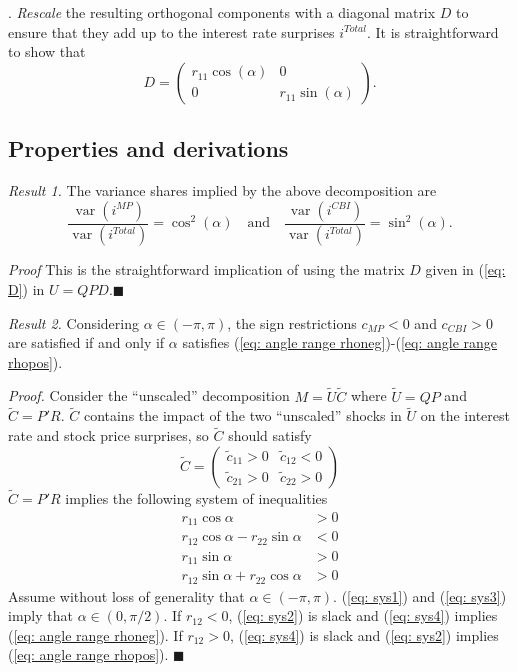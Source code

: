\documentclass[a4paper,12pt]{article}
\begin{document}
\bigskip
{}.  \emph{Rescale} the resulting orthogonal components with a diagonal matrix $D$ to ensure that they add up to the interest rate surprises $i^{Total}$. It is straightforward to show that
\begin{equation} D = \begin{pmatrix}r_{11} \cos(\alpha)&0\\0&r_{11}\sin(\alpha)\end{pmatrix}.\label{eq: D}\end{equation}

\subsection{Properties and derivations}

\emph{Result 1.} The variance shares implied by the above decomposition are
\begin{equation}
\frac{\operatorname{var}(i^{MP})}{\operatorname{var}(i^{Total})}=\cos^2(\alpha) \quad \text{and} \quad
\frac{\operatorname{var}(i^{CBI})}{\operatorname{var}(i^{Total})}=\sin^2(\alpha).\label{eq: varshares and angle}
\end{equation}

\emph{Proof} This is the straightforward implication of using the matrix $D$ given in (\ref{eq: D}) in $U=QPD$.$\blacksquare$

\noindent\emph{Result 2.} Considering $\alpha\in(-\pi,\pi)$, the sign restrictions $c_{MP}<0$ and $c_{CBI}>0$ are satisfied if and only if $\alpha$ satisfies (\ref{eq: angle range rhoneg})-(\ref{eq: angle range rhopos}).

\emph{Proof.}
Consider the ``unscaled'' decomposition $M=\tilde{U}\tilde{C}$ where $\tilde{U}=QP$ and $\tilde{C}=P'R$. $\tilde{C}$  contains the impact of the two ``unscaled'' shocks in $\tilde{U}$ on the interest rate and stock price surprises, so $\tilde{C}$ should satisfy
\[ \tilde{C}=\begin{pmatrix}\tilde{c}_{11}>0&\tilde{c}_{12}<0\\\tilde{c}_{21}>0&\tilde{c}_{22}>0\end{pmatrix}\]
$\tilde{C}=P'R$ implies the following system of inequalities
\begin{align}
r_{11}\cos\alpha &>0 \label{eq: sys1}\\
r_{12} \cos\alpha -r_{22}\sin\alpha &<0\label{eq: sys2}\\
r_{11}\sin\alpha&>0\label{eq: sys3}\\
r_{12} \sin\alpha+r_{22}\cos\alpha&>0\label{eq: sys4}
\end{align}
Assume without loss of generality that $\alpha\in(-\pi,\pi)$.  (\ref{eq: sys1}) and (\ref{eq: sys3}) imply that $\alpha\in(0,\pi/2)$.
If $r_{12}<0$, (\ref{eq: sys2}) is slack and (\ref{eq: sys4}) implies (\ref{eq: angle range rhoneg}).
If $r_{12}>0$, (\ref{eq: sys4}) is slack and (\ref{eq: sys2}) implies (\ref{eq: angle range rhopos}).
$\blacksquare$
\end{document}
